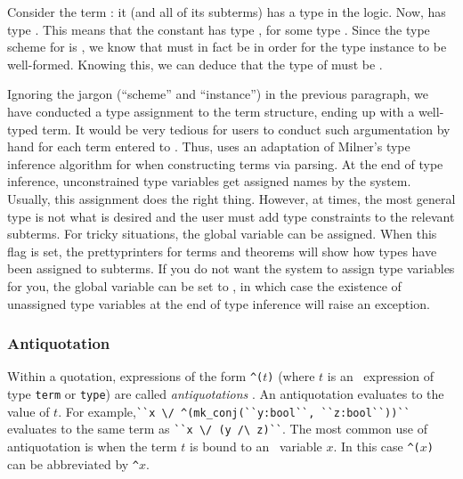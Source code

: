 {Consider the term : it (and all of its subterms)
has a type in the \HOL{} logic. Now,  has type . This
means that the constant \holtxt{=} has type ,
for some type . Since the type scheme for \holtxt{=} is
, we know that  must in fact be
 in order for the type instance to be well-formed. Knowing
this, we can deduce that the type of  must be .

Ignoring the jargon (``scheme'' and ``instance'') in the previous
paragraph, we have conducted a type assignment to the term structure,
ending up with a well-typed term. It would be very tedious for users
to conduct such argumentation by hand for each term entered to \HOL{}.
Thus, \HOL{} uses an adaptation of Milner's type inference algorithm
for \ML{} when constructing terms via parsing. At the end of type
inference, unconstrained type variables get assigned names by the system.
Usually, this assignment does the right thing. However, at times, the
most general type is not what is desired and the user must add type
constraints to the relevant subterms. For tricky situations, the
global variable  can be assigned. When this flag is
set, the prettyprinters for terms and theorems will show how types
have been assigned to subterms. If you do not want the system to
assign type variables for you, the global variable
 can be set to , in which case the
existence of unassigned type variables at the end of type inference
will raise an exception.

\subsubsection{Antiquotation}

Within a quotation, expressions of the form {\small\verb+^(+}$t${\small\verb+)+}
%
%
(where $t$ is an \ML\ expression of type
%
%
{\small\verb+term+} or {\small\verb+type+}) are called {\it antiquotations\/}
%
.
%
An antiquotation  evaluates to the
\ML{} value of $t$. For example,{\small\verb+``x \/ ^(mk_conj(``y:bool``, ``z:bool``))``+}
evaluates to the same term as {\small\verb+``x \/ (y /\ z)``+}. The
most common use of antiquotation is when the term $t$ is bound to an \ML\
variable $x$. In this case {\small\verb+^(+}$x${\small\verb+)+} can be
abbreviated by {\small\verb+^+}$x$.

}
